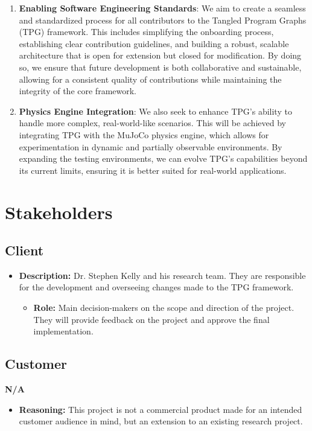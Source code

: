 \documentclass[12pt]{article}
\newcommand{\lips}{\textit{Insert your content here.}}
\begin{document}
\begin{enumerate}
  \item \textbf{Enabling Software Engineering Standards}: We aim to create a seamless and standardized process for all contributors to the Tangled Program Graphs (TPG) framework. This includes simplifying the onboarding process, establishing clear contribution guidelines, and building a robust, scalable architecture that is open for extension but closed for modification. By doing so, we ensure that future development is both collaborative and sustainable, allowing for a consistent quality of contributions while maintaining the integrity of the core framework.
  \item \textbf{Physics Engine Integration}: We also seek to enhance TPG's ability to handle more complex, real-world-like scenarios. This will be achieved by integrating TPG with the MuJoCo physics engine, which allows for experimentation in dynamic and partially observable environments. By expanding the testing environments, we can evolve TPG's capabilities beyond its current limits, ensuring it is better suited for real-world applications.
\end{enumerate}

\section{Stakeholders}
\subsection{Client}
\begin{itemize}
  \item \textbf{Description:} Dr. Stephen Kelly and his research team. They are responsible for the development and overseeing changes made to the TPG framework.
    \begin{itemize}
      \item \textbf{Role:} Main decision-makers on the scope and direction of the project. They will provide feedback on the project and approve the final implementation.
    \end{itemize}

  \end{itemize}





\subsection{Customer}
\textbf{N/A}
\begin{itemize}
\item \textbf{Reasoning:} This project is not a commercial product made for an intended customer audience in mind, but an extension to an existing research project.
\end{itemize}
\end{document}

